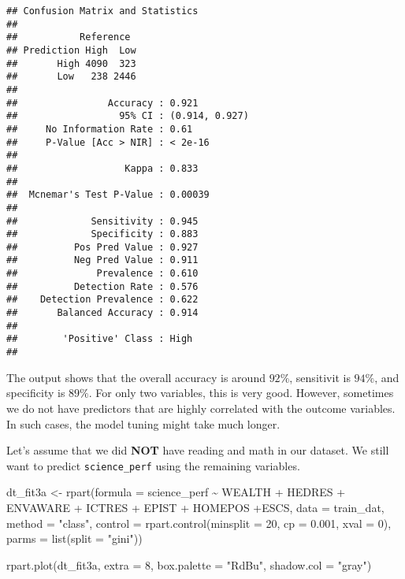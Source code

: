 \documentclass[
]{book}
\newenvironment{Shaded}{\begin{snugshade}}{\end{snugshade}}
\newcommand{\AttributeTok}[1]{\textcolor[rgb]{0.77,0.63,0.00}{#1}}
\newcommand{\DecValTok}[1]{\textcolor[rgb]{0.00,0.00,0.81}{#1}}
\newcommand{\FloatTok}[1]{\textcolor[rgb]{0.00,0.00,0.81}{#1}}
\newcommand{\FunctionTok}[1]{\textcolor[rgb]{0.00,0.00,0.00}{#1}}
\newcommand{\NormalTok}[1]{#1}
\newcommand{\OtherTok}[1]{\textcolor[rgb]{0.56,0.35,0.01}{#1}}
\newcommand{\SpecialCharTok}[1]{\textcolor[rgb]{0.00,0.00,0.00}{#1}}
\newcommand{\StringTok}[1]{\textcolor[rgb]{0.31,0.60,0.02}{#1}}
\begin{document}
\begin{verbatim}
## Confusion Matrix and Statistics
## 
##           Reference
## Prediction High  Low
##       High 4090  323
##       Low   238 2446
##                                         
##                Accuracy : 0.921         
##                  95% CI : (0.914, 0.927)
##     No Information Rate : 0.61          
##     P-Value [Acc > NIR] : < 2e-16       
##                                         
##                   Kappa : 0.833         
##                                         
##  Mcnemar's Test P-Value : 0.00039       
##                                         
##             Sensitivity : 0.945         
##             Specificity : 0.883         
##          Pos Pred Value : 0.927         
##          Neg Pred Value : 0.911         
##              Prevalence : 0.610         
##          Detection Rate : 0.576         
##    Detection Prevalence : 0.622         
##       Balanced Accuracy : 0.914         
##                                         
##        'Positive' Class : High          
## 
\end{verbatim}

The output shows that the overall accuracy is around \(92\%\), sensitivit is \(94\%\), and specificity is \(89\%\). For only two variables, this is very good. However, sometimes we do not have predictors that are highly correlated with the outcome variables. In such cases, the model tuning might take much longer.

Let's assume that we did \textbf{NOT} have reading and math in our dataset. We still want to predict \texttt{science\_perf} using the remaining variables.

\begin{Shaded}
\begin{Highlighting}[]
\NormalTok{dt\_fit3a }\OtherTok{\textless{}{-}} \FunctionTok{rpart}\NormalTok{(}\AttributeTok{formula =}\NormalTok{ science\_perf }\SpecialCharTok{\textasciitilde{}}\NormalTok{ WEALTH }\SpecialCharTok{+}\NormalTok{ HEDRES }\SpecialCharTok{+}\NormalTok{ ENVAWARE }\SpecialCharTok{+}\NormalTok{ ICTRES }\SpecialCharTok{+}\NormalTok{ EPIST }\SpecialCharTok{+} 
\NormalTok{                   HOMEPOS }\SpecialCharTok{+}\NormalTok{ESCS,}
                 \AttributeTok{data =}\NormalTok{ train\_dat,}
                 \AttributeTok{method =} \StringTok{"class"}\NormalTok{, }
                 \AttributeTok{control =} \FunctionTok{rpart.control}\NormalTok{(}\AttributeTok{minsplit =} \DecValTok{20}\NormalTok{, }
                                         \AttributeTok{cp =} \FloatTok{0.001}\NormalTok{, }
                                         \AttributeTok{xval =} \DecValTok{0}\NormalTok{),}
                \AttributeTok{parms =} \FunctionTok{list}\NormalTok{(}\AttributeTok{split =} \StringTok{"gini"}\NormalTok{))}

\FunctionTok{rpart.plot}\NormalTok{(dt\_fit3a, }\AttributeTok{extra =} \DecValTok{8}\NormalTok{, }\AttributeTok{box.palette =} \StringTok{"RdBu"}\NormalTok{, }\AttributeTok{shadow.col =} \StringTok{"gray"}\NormalTok{)}
\end{Highlighting}
\end{Shaded}
\end{document}
